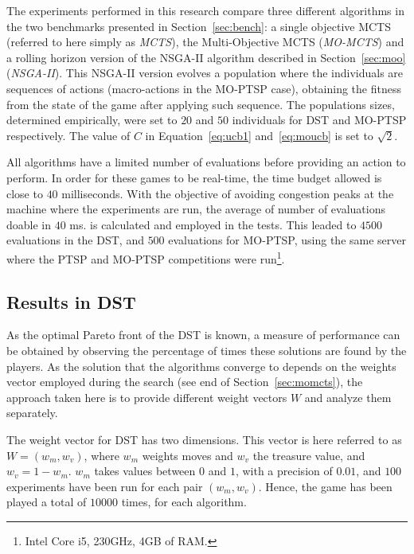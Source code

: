 \documentclass[journal]{IEEEtran}
\begin{document}
The experiments performed in this research compare three different algorithms in the two benchmarks presented in Section~\ref{sec:bench}: a single objective MCTS (referred to here simply as \textit{MCTS}), the Multi-Objective MCTS (\textit{MO-MCTS}) and a rolling horizon version of the NSGA-II algorithm described in Section~\ref{sec:moo} (\textit{NSGA-II}). This NSGA-II version evolves a population where the individuals are sequences of actions (macro-actions in the MO-PTSP case), obtaining the fitness from the state of the game after applying such sequence. The populations sizes, determined empirically, were set to $20$ and $50$ individuals for DST and MO-PTSP respectively. The value of $C$ in Equation~\ref{eq:ucb1} and~\ref{eq:moucb} is set to $\sqrt{2}$.

All algorithms have a limited number of evaluations before providing an action to perform. In order for these games to be real-time, the time budget allowed is close to $40$ milliseconds. With the objective of avoiding congestion peaks at the machine where the experiments are run, the average of number of evaluations doable in $40$ ms. is calculated and employed in the tests. This leaded to $4500$ evaluations in the DST, and $500$ evaluations for MO-PTSP, using the same server where the PTSP and MO-PTSP competitions were run\footnote{Intel Core i5, 230GHz, 4GB of RAM.}.


\subsection{Results in DST} \label{ssec:resDST}

As the optimal Pareto front of the DST is known, a measure of performance can be obtained by observing the percentage of times these solutions are found by the players. As the solution that the algorithms converge to depends on the weights vector employed during the search (see end of Section~\ref{sec:momcts}), the approach taken here is to provide different weight vectors $W$ and analyze them separately.  

The weight vector for DST has two dimensions. This vector is here referred to as $W = (w_m, w_v)$, where $w_m$ weights moves and $w_v$ the treasure value, and $w_v = 1 - w_m$. $w_m$ takes values between $0$ and $1$, with a precision of $0.01$, and $100$ experiments have been run for each pair $(w_m, w_v)$. Hence, the game has been played a total of $10000$ times, for each algorithm.
\end{document}
